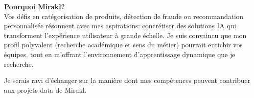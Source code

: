 \textbf{Pourquoi Mirakl?}\\
Vos défis en catégorisation de produits, détection de fraude ou recommandation personnalisée résonnent avec mes aspirations: concrétiser des solutions IA qui transforment l'expérience utilisateur à grande échelle. Je suis convaincu que mon profil polyvalent (recherche académique et sens du métier) pourrait enrichir vos équipes, tout en m'offrant l'environnement d'apprentissage dynamique que je recherche.

Je serais ravi d'échanger sur la manière dont mes compétences peuvent contribuer aux projets data de Mirakl.

\makeletterclosing
